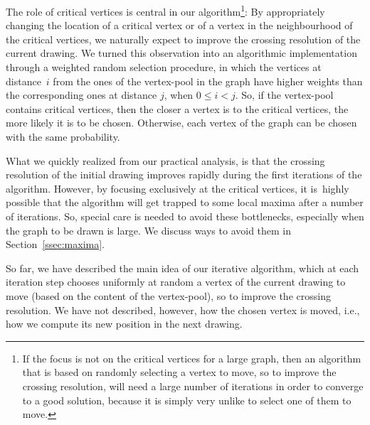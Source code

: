 \documentclass[runningheads]{llncs}
\begin{document}
The role of critical vertices is central in our algorithm\footnote{If the focus is not on the critical vertices for a large graph, then an algorithm that is based on randomly selecting a vertex to move, so to improve the crossing resolution, will need a large number of iterations in order to converge to a good solution, because it is simply very unlike to select one of them to move.}: By appropriately changing the location of a critical vertex or of a vertex in the neighbourhood of the critical vertices, we naturally expect to improve the crossing resolution of the current drawing. We turned this observation into an algorithmic implementation through a weighted random selection procedure, in which the vertices at distance~$i$ from the ones of the vertex-pool in the graph have higher weights than the corresponding ones at distance $j$, when $0 \leq i<j$. So, if the vertex-pool contains critical vertices, then the closer a vertex is to the critical vertices, the more likely it is to be chosen. Otherwise, each vertex of the graph can be chosen with the same probability.

What we quickly realized from our practical analysis, is that the crossing resolution of the initial drawing improves rapidly during the first iterations of the algorithm. However, by focusing exclusively at the critical vertices, it is~highly possible that the algorithm will get trapped to some local maxima after a number of iterations. So, special care is needed to avoid these bottlenecks, especially when the graph to be drawn is large. We discuss ways to avoid them in  Section~\ref{ssec:maxima}.

So far, we have described the main idea of our iterative algorithm, which at each iteration step chooses uniformly at random a vertex of the current drawing to move (based on the content of the vertex-pool), so to improve the crossing resolution. We have not described, however, how the chosen vertex is moved, i.e., how we compute its new position in the next drawing.  
\end{document}
